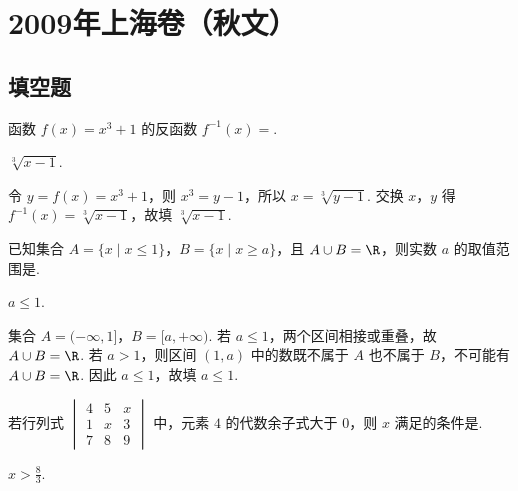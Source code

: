 \chapter{2009年上海卷（秋文）}

\section{填空题}

\begin{problem}
函数 \(f(x) = x^3 + 1\) 的反函数 \(f^{-1}(x) =\)\fillinblank{}.
\end{problem}

\begin{answer}
\(\sqrt[3]{x-1}\).
\end{answer}

\begin{solution}
令 \(y=f(x)=x^3+1\)，则 \(x^3=y-1\)，所以 \(x=\sqrt[3]{y-1}\). 交换 \(x\)，\(y\) 得 \(f^{-1}(x)=\sqrt[3]{x-1}\)，故填 \(\sqrt[3]{x-1}\).
\end{solution}

\begin{problem}
已知集合 \(A = \{x \mid x \leqslant 1\}\)，\(B = \{x \mid x \geqslant a\}\)，且 \(A \cup B = \R\)，则实数 \(a\) 的取值范围是\fillinblank{}.
\end{problem}

\begin{answer}
\(a \leqslant 1\).
\end{answer}

\begin{solution}
集合 \(A=(-\infty,1]\)，\(B=[a,+\infty)\). 若 \(a\leqslant1\)，两个区间相接或重叠，故 \(A\cup B=\R\). 若 \(a>1\)，则区间 \((1,a)\) 中的数既不属于 \(A\) 也不属于 \(B\)，不可能有 \(A\cup B=\R\). 因此 \(a\leqslant1\)，故填 \(a\leqslant1\).
\end{solution}

\begin{problem}
若行列式 \(\begin{vmatrix} 4 & 5 & x \\ 1 & x & 3 \\ 7 & 8 & 9 \end{vmatrix}\) 中，元素 \(4\) 的代数余子式大于 \(0\)，则 \(x\) 满足的条件是\fillinblank{}.
\end{problem}

\begin{answer}
\(x > \frac{8}{3}\).
\end{answer}

